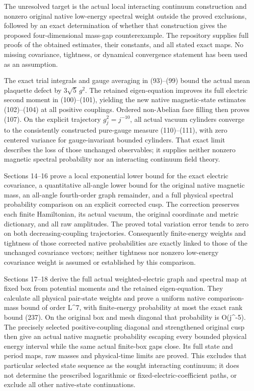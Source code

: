 \documentclass[
  11pt,
]{article}
\begin{document}
The unresolved target is the actual local interacting continuum
construction and nonzero original native low-energy spectral weight
outside the proved exclusions, followed by an exact determination of
whether that construction gives the proposed four-dimensional mass-gap
counterexample. The repository supplies full proofs of the obtained
estimates, their constants, and all stated exact maps. No missing
covariance, tightness, or dynamical convergence statement has been used
as an assumption.

The exact trial integrals and gauge averaging in (93)--(99) bound the
actual mean plaquette defect by \(3\sqrt5\,g^2\). The retained
eigen-equation improves its full electric second moment in (100)--(101),
yielding the new native magnetic-state estimates (102)--(104) at all
positive couplings. Ordered non-Abelian face filling then proves (107).
On the explicit trajectory \(g_j^2=j^{-10}\), all actual vacuum
cylinders converge to the consistently constructed pure-gauge measure
(110)--(111), with zero centered variance for gauge-invariant bounded
cylinders. That exact limit describes the loss of those unchanged
observables; it supplies neither nonzero magnetic spectral probability
nor an interacting continuum field theory.

Sections 14--16 prove a local exponential lower bound for the exact
electric covariance, a quantitative all-angle lower bound for the
original native magnetic mass, an all-angle fourth-order graph
remainder, and a full physical spectral probability comparison on an
explicit corrected cusp. The correction preserves each finite
Hamiltonian, its actual vacuum, the original coordinate and metric
dictionary, and all raw amplitudes. The proved total variation error
tends to zero on both decreasing-coupling trajectories. Consequently
finite-energy weights and tightness of those corrected native
probabilities are exactly linked to those of the unchanged covariance
vectors; neither tightness nor nonzero low-energy covariance weight is
assumed or established by this comparison.

Sections 17--18 derive the full actual weighted-electric graph and
spectral map at fixed box from potential moments and the retained
eigen-equation. They calculate all physical pair-state weights and prove
a uniform native comparison-mass bound of order L\^{}7, with
finite-energy probability at most the exact rank bound (237). On the
original box and mesh diagonal that probability is O(j\^{}-5). The
precisely selected positive-coupling diagonal and strengthened original
cusp then give an actual native magnetic probability escaping every
bounded physical energy interval while the same actual finite-box gaps
close. Its full state and period maps, raw masses and physical-time
limits are proved. This excludes that particular selected state sequence
as the sought interacting continuum; it does not determine the
prescribed logarithmic or fixed-electric-coefficient paths, or exclude
all other native-state continuations.
\end{document}
